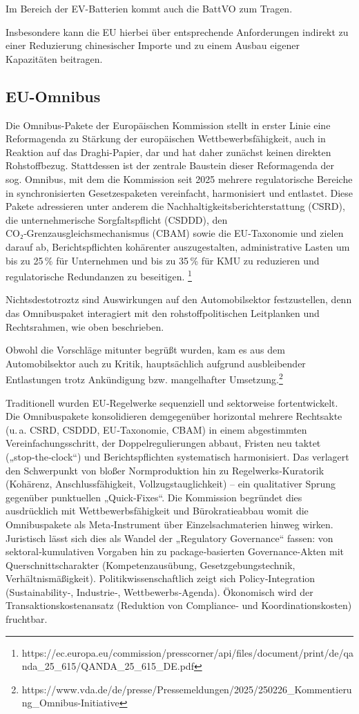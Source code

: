 \documentclass[12pt,a4paper,oneside]{book} %
\begin{document}
Im Bereich der EV-Batterien kommt auch die BattVO zum Tragen.

Insbesondere kann die EU hierbei über entsprechende Anforderungen indirekt zu einer Reduzierung chinesischer Importe und zu einem Ausbau eigener Kapazitäten beitragen.

\subsection{EU-Omnibus}

Die Omnibus-Pakete der Europäischen Kommission stellt in erster Linie eine Reformagenda zu Stärkung der europäischen Wettbewerbsfähigkeit, auch in Reaktion auf das Draghi-Papier, dar und hat daher zunächst keinen direkten Rohstoffbezug. Stattdessen ist der zentrale Baustein dieser Reformagenda der sog. Omnibus, mit dem die Kommission seit 2025  mehrere regulatorische Bereiche in synchronisierten Gesetzespaketen vereinfacht, harmonisiert und entlastet. Diese Pakete adressieren unter anderem die Nachhaltigkeitsberichterstattung (CSRD), die unternehmerische Sorgfaltspflicht (CSDDD), den CO₂‑Grenzausgleichsmechanismus (CBAM) sowie die EU‑Taxonomie und zielen darauf ab, Berichtspflichten kohärenter auszugestalten, administrative Lasten um bis zu 25 \% für Unternehmen und bis zu 35 \% für KMU zu reduzieren und regulatorische Redundanzen zu beseitigen. \footnote{https://ec.europa.eu/commission/presscorner/api/files/document/print/de/qanda_25_615/QANDA_25_615_DE.pdf}

Nichtsdestotroztz sind Auswirkungen auf den Automobilsektor festzustellen, denn das Omnibuspaket interagiert mit den rohstoffpolitischen Leitplanken und Rechtsrahmen, wie oben beschrieben.

Obwohl die Vorschläge mitunter begrüßt wurden, kam es aus dem Automobilsektor auch zu Kritik, hauptsächlich aufgrund ausbleibender Entlastungen trotz Ankündigung bzw. mangelhafter Umsetzung.\footnote{https://www.vda.de/de/presse/Pressemeldungen/2025/250226_Kommentierung_Omnibus-Initiative}

Traditionell wurden EU‑Regelwerke sequenziell und sektorweise fortentwickelt. Die Omnibuspakete konsolidieren demgegenüber horizontal mehrere Rechtsakte (u. a. CSRD, CSDDD, EU‑Taxonomie, CBAM) in einem abgestimmten Vereinfachungsschritt, der Doppelregulierungen abbaut, Fristen neu taktet („stop‑the‑clock“) und Berichtspflichten systematisch harmonisiert. Das verlagert den Schwerpunkt von bloßer Normproduktion hin zu Regelwerks‑Kuratorik (Kohärenz, Anschlussfähigkeit, Vollzugstauglichkeit) – ein qualitativer Sprung gegenüber punktuellen „Quick‑Fixes“. Die Kommission begründet dies ausdrücklich mit Wettbewerbsfähigkeit und Bürokratieabbau womit die Omnibuspakete als Meta‑Instrument über Einzelsachmaterien hinweg wirken.
Juristisch lässt sich dies als Wandel der „Regulatory Governance“ fassen: von sektoral‑kumulativen Vorgaben hin zu package‑basierten Governance‑Akten mit Querschnittscharakter (Kompetenzausübung, Gesetzgebungstechnik, Verhältnismäßigkeit). Politikwissenschaftlich zeigt sich Policy‑Integration (Sustainability‑, Industrie‑, Wettbewerbs‑Agenda). Ökonomisch wird der Transaktionskostenansatz (Reduktion von Compliance‑ und Koordinationskosten) fruchtbar.
\end{document}
